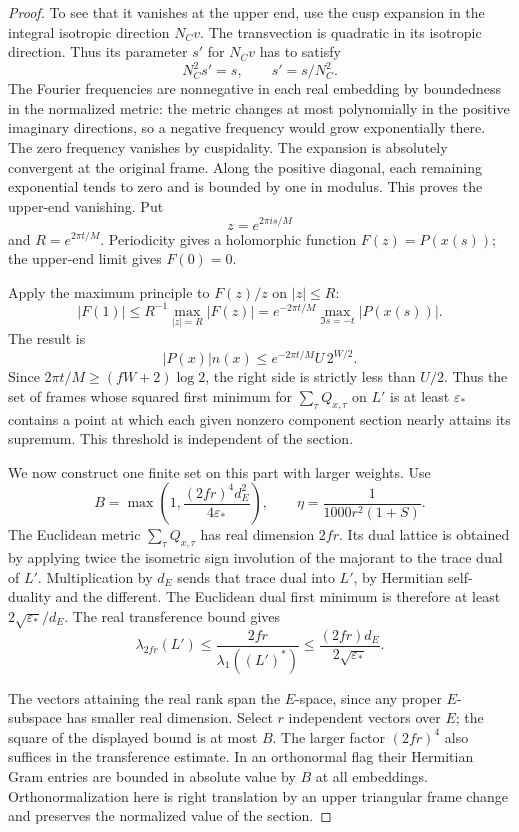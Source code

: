 \begin{proof}
To see that it vanishes at the upper end, use the cusp
expansion in the integral isotropic direction \(N_Cv\).
The transvection is quadratic in its isotropic direction. Thus its parameter \(s'\) for \(N_Cv\) has to satisfy
\[
  N_C^2s'=s,\qquad s'=s/N_C^2.
\]
The Fourier frequencies are nonnegative in each real embedding
by boundedness in the normalized metric: the metric changes
at most polynomially in the positive imaginary directions,
so a negative frequency would grow exponentially there.
The zero frequency vanishes by cuspidality. The expansion
is absolutely convergent at the original frame. Along the
positive diagonal, each remaining exponential tends to zero
and is bounded by one in modulus. This proves the upper-end
vanishing. Put 
\[
  z=e^{2\pi i s/M}
\]
 and \(R=e^{2\pi t/M}\). Periodicity gives
a holomorphic function \(F(z)=P(x(s))\); the upper-end limit gives
\(F(0)=0\).

Apply the maximum principle to \(F(z)/z\) on \(|z|\le R\):
\[
 |F(1)|\le R^{-1}\max_{|z|=R}|F(z)|
        =e^{-2\pi t/M}\max_{\Im s=-t}|P(x(s))|.
\] The result is
\[
 |P(x)|n(x)\le e^{-2\pi t/M} U\,2^{W/2}.
\]
Since \(2\pi t/M\ge(fW+2)\log 2\), the right side is strictly
less than \(U/2\). Thus the set of frames whose squared first
minimum for \(\sum_\tau Q_{x,\tau}\) on \(L'\) is at least
\(\varepsilon_*\) contains a point at which each given nonzero component section nearly attains its supremum. This threshold is independent of
the section. \label{cor:slice-evaluation-net-2}

We now construct one finite set on this part with larger weights. Use
\[
 B=\max\left(1,\frac{(2fr)^4d_E^2}{4\varepsilon_*}\right),
 \qquad
 \eta=\frac{1}{1000r^2(1+S)}.
\]
The Euclidean metric \(\sum_\tau Q_{x,\tau}\) has real
dimension \(2fr\). Its dual lattice is obtained by applying
twice the isometric sign involution of the majorant to the
trace dual of \(L'\). Multiplication by \(d_E\) sends that
trace dual into \(L'\), by Hermitian self-duality and the
different. The Euclidean dual first minimum is therefore
at least \(2\sqrt{\varepsilon_*}/d_E\). The real transference bound gives
\[
 \lambda_{2fr}(L')
 \le\frac{2fr}{\lambda_1((L')^*)}
 \le\frac{(2fr)d_E}{2\sqrt{\varepsilon_*}} .
\]

The vectors attaining the real rank span the \(E\)-space, since
any proper \(E\)-subspace has smaller real dimension. Select \(r\)
independent vectors over \(E\); the square of the displayed bound
is at most \(B\). The larger factor \((2fr)^4\) also suffices in the transference estimate. \cite{banaszczyk}
In an orthonormal flag their Hermitian Gram entries
are bounded in absolute value by \(B\) at all embeddings.
Orthonormalization here is right translation by an upper
triangular frame change and preserves the normalized value of the section.


\end{proof}
